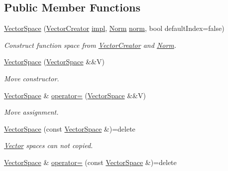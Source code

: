 \subsection*{Public Member Functions}
\begin{DoxyCompactItemize}
\item 
\hyperlink{classSpacy_1_1VectorSpace_aecc476a42a9b37395ccc76bd2757e39e_aecc476a42a9b37395ccc76bd2757e39e}{Vector\+Space} (\hyperlink{group__SpacyGroup_ga1f5316487c031a478247206764bb2efb_ga1f5316487c031a478247206764bb2efb}{Vector\+Creator} \hyperlink{classSpacy_1_1Mixin_1_1Impl_a5e61399bae41338a87e701b24b13f52a}{impl}, \hyperlink{group__SpacyGroup_gaf4f33b11d657c48566d961a013c92bd1_gaf4f33b11d657c48566d961a013c92bd1}{Norm} \hyperlink{classSpacy_1_1VectorSpace_a2f26e33994544a37a83e6938a748ab8c}{norm}, bool default\+Index=false)
\begin{DoxyCompactList}\small\item\em Construct function space from \hyperlink{group__SpacyGroup_ga1f5316487c031a478247206764bb2efb_VectorCreatorAnchor}{Vector\+Creator} and \hyperlink{group__SpacyGroup_gaf4f33b11d657c48566d961a013c92bd1_NormAnchor}{Norm}. \end{DoxyCompactList}\item 
\hyperlink{classSpacy_1_1VectorSpace_a2bc6444dc35de9fe68d7a8156c03125f_a2bc6444dc35de9fe68d7a8156c03125f}{Vector\+Space} (\hyperlink{classSpacy_1_1VectorSpace}{Vector\+Space} \&\&V)
\begin{DoxyCompactList}\small\item\em Move constructor. \end{DoxyCompactList}\item 
\hyperlink{classSpacy_1_1VectorSpace}{Vector\+Space} \& \hyperlink{classSpacy_1_1VectorSpace_a5c43f6cca9f16ee3839e813633f87370_a5c43f6cca9f16ee3839e813633f87370}{operator=} (\hyperlink{classSpacy_1_1VectorSpace}{Vector\+Space} \&\&V)
\begin{DoxyCompactList}\small\item\em Move assignment. \end{DoxyCompactList}\item 
\hypertarget{classSpacy_1_1VectorSpace_ae8f3f22a43fcc418c447b5f49568d54e}{}\hyperlink{classSpacy_1_1VectorSpace_ae8f3f22a43fcc418c447b5f49568d54e}{Vector\+Space} (const \hyperlink{classSpacy_1_1VectorSpace}{Vector\+Space} \&)=delete\label{classSpacy_1_1VectorSpace_ae8f3f22a43fcc418c447b5f49568d54e}

\begin{DoxyCompactList}\small\item\em \hyperlink{classSpacy_1_1Vector}{Vector} spaces can not copied. \end{DoxyCompactList}\item 
\hypertarget{classSpacy_1_1VectorSpace_a30d39a339ed924a6c17c85d75f64afc4}{}\hyperlink{classSpacy_1_1VectorSpace}{Vector\+Space} \& \hyperlink{classSpacy_1_1VectorSpace_a30d39a339ed924a6c17c85d75f64afc4}{operator=} (const \hyperlink{classSpacy_1_1VectorSpace}{Vector\+Space} \&)=delete\label{classSpacy_1_1VectorSpace_a30d39a339ed924a6c17c85d75f64afc4}


\end{DoxyCompactItemize}
